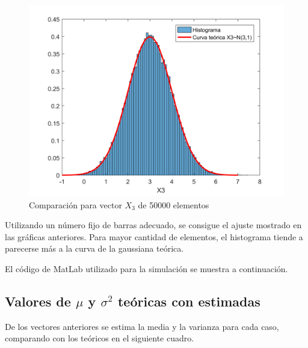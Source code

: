\begin{figure}[!ht]
\begin{centering}
\includegraphics[scale=0.55]{Imagenes/X3_50000.png}
\par\end{centering}
\caption{Comparación para vector $X_3$ de 50000 elementos}

\end{figure} 

Utilizando un n\'umero fijo de barras adecuado, se consigue el ajuste mostrado en las gr\'aficas anteriores. Para mayor cantidad de elementos, el histograma tiende a parecerse m\'as a la curva de la gaussiana te\'orica.\par
El c\'odigo de MatLab utilizado para la simulaci\'on se muestra a continuaci\'on.



\subsection{Valores de $\mu$ y $\sigma^2$ te\'oricas con estimadas}

De los vectores anteriores se estima la media y la varianza para cada caso, comparando con los te\'oricos en el siguiente cuadro.

